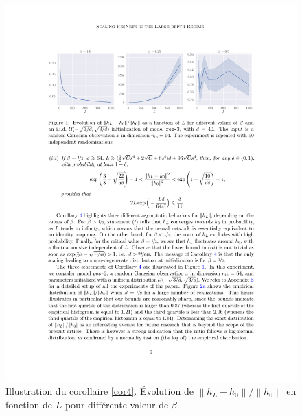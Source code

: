 \begin{figure}[htbp]
    \centering
    \includegraphics[width=.95\textwidth]{figs/figure_cor4.pdf}
    \caption{Illustration du corollaire \ref{cor4}. Évolution de $ \left\| h_L - h_0 \right\| / \left\| h_0 \right\| $ en fonction de $ L $ pour différente valeur de $ \beta  $.}
    \label{fig:cor4}
\end{figure}

